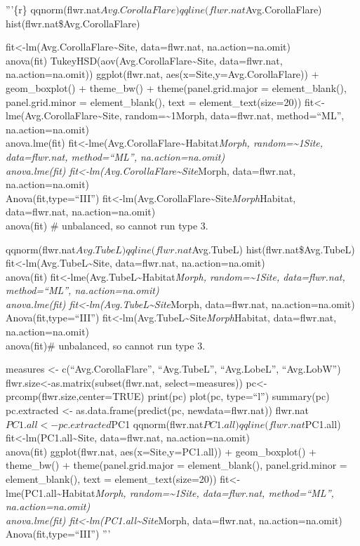 \documentclass[]{article}
\begin{document}
'''\{r\}
qqnorm(flwr.nat\(Avg.CorollaFlare) qqline(flwr.nat\)Avg.CorollaFlare)
hist(flwr.nat\$Avg.CorollaFlare)

fit\textless{}-lm(Avg.CorollaFlare\textasciitilde{}Site, data=flwr.nat,
na.action=na.omit)\\
anova(fit) TukeyHSD(aov(Avg.CorollaFlare\textasciitilde{}Site,
data=flwr.nat, na.action=na.omit)) ggplot(flwr.nat,
aes(x=Site,y=Avg.CorollaFlare)) + geom\_boxplot() + theme\_bw() +
theme(panel.grid.major = element\_blank(), panel.grid.minor =
element\_blank(), text = element\_text(size=20))
fit\textless{}-lme(Avg.CorollaFlare\textasciitilde{}Site,
random=\textasciitilde{}1\textbar{}Morph, data=flwr.nat, method=``ML'',
na.action=na.omit)\\
anova.lme(fit)
fit\textless{}-lme(Avg.CorollaFlare\textasciitilde{}Habitat\emph{Morph,
random=\textasciitilde{}1\textbar{}Site, data=flwr.nat, method=``ML'',
na.action=na.omit)\\
anova.lme(fit)
fit\textless{}-lm(Avg.CorollaFlare\textasciitilde{}Site}Morph,
data=flwr.nat, na.action=na.omit)\\
Anova(fit,type=``III'')
fit\textless{}-lm(Avg.CorollaFlare\textasciitilde{}Site\emph{Morph}Habitat,
data=flwr.nat, na.action=na.omit)\\
anova(fit) \# unbalanced, so cannot run type 3.

qqnorm(flwr.nat\(Avg.TubeL) qqline(flwr.nat\)Avg.TubeL)
hist(flwr.nat\$Avg.TubeL)
fit\textless{}-lm(Avg.TubeL\textasciitilde{}Site, data=flwr.nat,
na.action=na.omit)\\
anova(fit)
fit\textless{}-lme(Avg.TubeL\textasciitilde{}Habitat\emph{Morph,
random=\textasciitilde{}1\textbar{}Site, data=flwr.nat, method=``ML'',
na.action=na.omit)\\
anova.lme(fit) fit\textless{}-lm(Avg.TubeL\textasciitilde{}Site}Morph,
data=flwr.nat, na.action=na.omit)\\
Anova(fit,type=``III'')
fit\textless{}-lm(Avg.TubeL\textasciitilde{}Site\emph{Morph}Habitat,
data=flwr.nat, na.action=na.omit)\\
anova(fit)\# unbalanced, so cannot run type 3.

measures \textless{}- c(``Avg.CorollaFlare'', ``Avg.TubeL'',
``Avg.LobeL'', ``Avg.LobW'')
flwr.size\textless{}-as.matrix(subset(flwr.nat, select=measures))
pc\textless{}-prcomp(flwr.size,center=TRUE) print(pc) plot(pc,
type=``l'') summary(pc) pc.extracted \textless{}-
as.data.frame(predict(pc, newdata=flwr.nat))
flwr.nat\(PC1.all <- pc.extracted\)PC1
qqnorm(flwr.nat\(PC1.all) qqline(flwr.nat\)PC1.all)
fit\textless{}-lm(PC1.all\textasciitilde{}Site, data=flwr.nat,
na.action=na.omit)\\
anova(fit) ggplot(flwr.nat, aes(x=Site,y=PC1.all)) + geom\_boxplot() +
theme\_bw() + theme(panel.grid.major = element\_blank(),
panel.grid.minor = element\_blank(), text = element\_text(size=20))
fit\textless{}-lme(PC1.all\textasciitilde{}Habitat\emph{Morph,
random=\textasciitilde{}1\textbar{}Site, data=flwr.nat, method=``ML'',
na.action=na.omit)\\
anova.lme(fit) fit\textless{}-lm(PC1.all\textasciitilde{}Site}Morph,
data=flwr.nat, na.action=na.omit)\\
Anova(fit,type=``III'') '''
\end{document}
